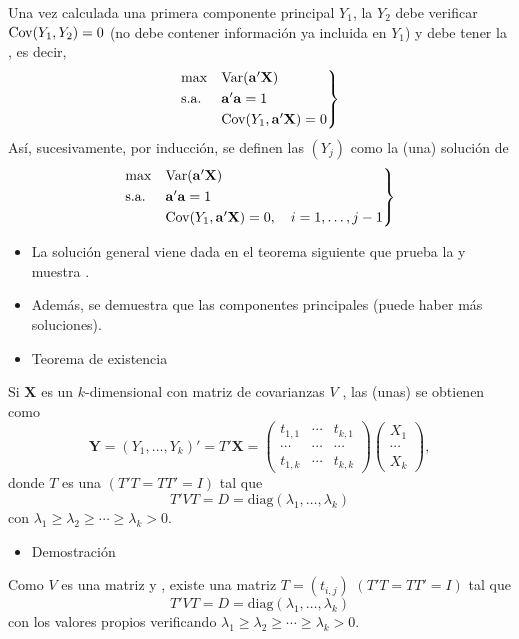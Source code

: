 Una vez calculada una primera componente principal $Y_1$, la  $Y_2$ debe verificar $\operatorname{Cov}(Y_1,Y_2)=0$ (no debe contener información ya incluida en $Y_1$) y debe tener la , es decir, \[ \begin{rcases}
	\max & \operatorname{Var}(\mathbf{a'X})\\
	\text{s.a.} & \mathbf{a'a}=1\\
	&\operatorname{Cov}(Y_1,\mathbf{a'X})=0
\end{rcases} \]
Así, sucesivamente, por inducción, se definen las  $(Y_j)$ como la (una) solución de 
\[ \begin{rcases}
	\max & \operatorname{Var}(\mathbf{a'X})\\
	\text{s.a.} & \mathbf{a'a}=1\\
	&\operatorname{Cov}(Y_1,\mathbf{a'X})=0,\quad i=1,\dots,j-1
\end{rcases} \]
\begin{itemize}[label=\color{lightblue}\textbullet]
	\item La solución general viene dada en el teorema siguiente que prueba la  y muestra .
	\item Además, se demuestra que las componentes principales  (puede haber más soluciones).
\end{itemize}
\begin{itemize}[label=\color{red}\textbullet, leftmargin=*]
	\item \color{lightblue}Teorema de existencia
\end{itemize}
Si $\mathbf{X}$ es un \vea $k$-dimensional con matriz de covarianzas $V$ , las (unas)  se obtienen como \[ \mathbf{Y}=(Y_1,\dots,Y_k)'=T'\mathbf{X}=\begin{pmatrix}
	t_{1,1} & \cdots & t_{k,1} \\
	\cdots & \cdots & \cdots \\
	t_{1,k} & \cdots & t_{k,k}
\end{pmatrix}\begin{pmatrix}
X_1\\
\cdots\\
X_k
\end{pmatrix}, \] donde $T$ es una  $(T'T=TT'=I)$ tal que \[ T'VT=D=\mathrm{diag}(\lambda_1,\dots,\lambda_k) \]con $\lambda_1\ge\lambda_2\ge\cdots\ge\lambda_k>0$.
\begin{itemize}[label=\color{red}\textbullet, leftmargin=*]
	\item \color{lightblue}Demostración
\end{itemize}
Como $V$ es una matriz  y , existe una matriz $T=(t_{i,j})$  $(T'T=TT'=I)$ tal que \[ T'VT=D=\mathrm{diag}(\lambda_1,\dots,\lambda_k) \] con los valores propios verificando $\lambda_1\ge\lambda_2\ge\cdots\ge\lambda_k>0$.

